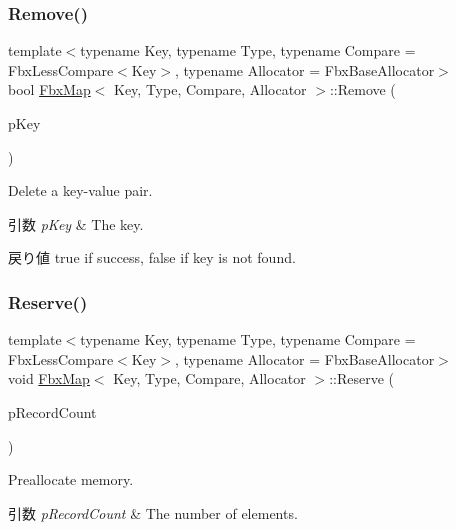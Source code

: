 \subsubsection{\texorpdfstring{Remove()}{Remove()}}
{\footnotesize\ttfamily template$<$typename Key, typename Type, typename Compare = Fbx\+Less\+Compare$<$\+Key$>$, typename Allocator = Fbx\+Base\+Allocator$>$ \\
bool \hyperlink{class_fbx_map}{Fbx\+Map}$<$ Key, Type, Compare, Allocator $>$\+::Remove (\begin{DoxyParamCaption}\item[{const \hyperlink{class_fbx_map_ad8392c83b6f8eeb9e0706bcc8674270a}{Key\+Type} \&}]{p\+Key }\end{DoxyParamCaption})}

Delete a key-\/value pair. 
\begin{DoxyParams}{引数}
{\em p\+Key} & The key. \\
\hline
\end{DoxyParams}
\begin{DoxyReturn}{戻り値}
{\ttfamily true} if success, {\ttfamily false} if key is not found. 
\end{DoxyReturn}
\mbox{\label{class_fbx_map_ad9fcc220fda44cdd23ad848d1dcd5725}} 
\subsubsection{\texorpdfstring{Reserve()}{Reserve()}}
{\footnotesize\ttfamily template$<$typename Key, typename Type, typename Compare = Fbx\+Less\+Compare$<$\+Key$>$, typename Allocator = Fbx\+Base\+Allocator$>$ \\
void \hyperlink{class_fbx_map}{Fbx\+Map}$<$ Key, Type, Compare, Allocator $>$\+::Reserve (\begin{DoxyParamCaption}\item[{unsigned int}]{p\+Record\+Count }\end{DoxyParamCaption})}

Preallocate memory. 
\begin{DoxyParams}{引数}
{\em p\+Record\+Count} & The number of elements. \\
\hline
\end{DoxyParams}
\mbox{\label{class_fbx_map_a4ad230da7739de9f136a07d7565411ab}} 
